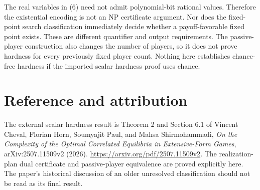 \documentclass[11pt]{article}
\begin{document}
The real variables in (6) need not admit polynomial-bit rational values.
Therefore the existential encoding is not an NP certificate argument.
Nor does the fixed-point search classification immediately decide whether
a payoff-favorable fixed point exists. These are different quantifier
and output requirements. The passive-player construction also changes
the number of players, so it does not prove hardness for every previously
fixed player count. Nothing here establishes chance-free hardness if
the imported scalar hardness proof uses chance.

\section*{Reference and attribution}
The external scalar hardness result is Theorem 2 and Section 6.1 of
Vincent Cheval, Florian Horn, Soumyajit Paul, and Mahsa Shirmohammadi,
\emph{On the Complexity of the Optimal Correlated Equilibria in
Extensive-Form Games}, arXiv:2507.11509v2 (2026).
\url{https://arxiv.org/pdf/2507.11509v2}.
The realization-plan dual certificate and passive-player equivalence
are proved explicitly here. The paper's historical discussion of an
older unresolved classification should not be read as its final result.
\end{document}

